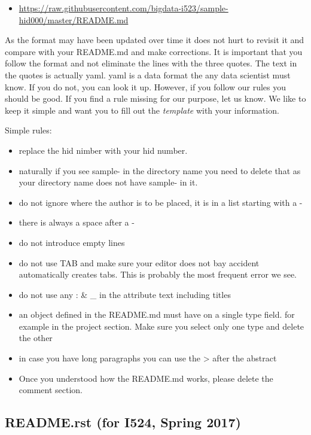 \begin{itemize}

\item
  \url{https://raw.githubusercontent.com/bigdata-i523/sample-hid000/master/README.md}
\end{itemize}

As the format may have been updated over time it does not hurt to
revisit it and compare with your README.md and make corrections. It is
important that you follow the format and not eliminate the lines with
the three quotes. The text in the quotes is actually yaml. yaml is a
data format the any data scientist must know. If you do not, you can
look it up. However, if you follow our rules you should be good. If you
find a rule missing for our purpose, let us know. We like to keep it
simple and want you to fill out the \emph{template} with your
information.

Simple rules:

\begin{itemize}

\item
  replace the hid nimber with your hid number.
\item
  naturally if you see sample- in the directory name you need to delete
  that as your directory name does not have sample- in it.
\item
  do not ignore where the author is to be placed, it is in a list
  starting with a -
\item
  there is always a space after a -
\item
  do not introduce empty lines
\item
  do not use TAB and make sure your editor does not bay accident
  automatically creates tabs. This is probably the most frequent error
  we see.
\item
  do not use any : \& \_ in the attribute text including titles
\item
  an object defined in the README.md must have on a single type field.
  for example in the project section. Make sure you select only one type
  and delete the other
\item
  in case you have long paragraphs you can use the \textgreater{} after
  the abstract
\item
  Once you understood how the README.md works, please delete the comment
  section.
\end{itemize}

\subsection{README.rst (for I524, Spring
2017)}\label{readme.rst-for-i524-spring-2017}

